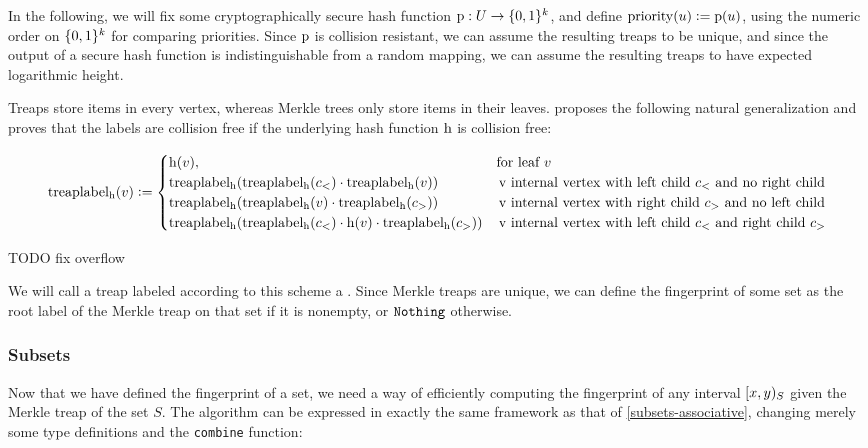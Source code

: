 In the following, we will fix some cryptographically secure hash function ${\operatorname{p}}: {U} \rightarrow {\{0, 1\}^k}$, and define $\operatorname{priority}(u) \vcentcolon= \operatorname{p}(u)$, using the numeric order on $\{0, 1\}^k$ for comparing priorities. Since $\operatorname{p}$ is collision resistant, we can assume the resulting treaps to be unique, and since the output of a secure hash function is indistinguishable from a random mapping, we can assume the resulting treaps to have expected logarithmic height.

Treaps store items in every vertex, whereas Merkle trees only store items in their leaves. \cite{buldas2002eliminating} proposes the following natural generalization and proves that the labels are collision free if the underlying hash function $\operatorname{h}$ is collision free:

  \[
   \operatorname{treaplabel_{\operatorname{h}}}(v) \vcentcolon= \begin{cases}
\operatorname{h}(v), &  \text{for leaf $v$} \\
\operatorname{treaplabel_{\operatorname{h}}}(\operatorname{treaplabel_{\operatorname{h}}}(c_{<}) \cdot \operatorname{treaplabel_{\operatorname{h}}}(v)) & \, \text{v internal vertex with left child $c_{<}$ and no right child}\\
\operatorname{treaplabel_{\operatorname{h}}}(\operatorname{treaplabel_{\operatorname{h}}}(v) \cdot \operatorname{treaplabel_{\operatorname{h}}}(c_{>})) & \, \text{v internal vertex with right child $c_{>}$ and no left child}\\
\operatorname{treaplabel_{\operatorname{h}}}(\operatorname{treaplabel_{\operatorname{h}}}(c_{<}) \cdot \operatorname{h}(v) \cdot \operatorname{treaplabel_{\operatorname{h}}}(c_{>})) & \, \text{v internal vertex with left child $c_{<}$ and right child $c_{>}$}
\end{cases}
  \]

TODO fix overflow

We will call a treap labeled according to this scheme a . Since Merkle treaps are unique, we can define the fingerprint of some set as the root label of the Merkle treap on that set if it is nonempty, or $\mathtt{Nothing}$ otherwise.

\subsubsection{Subsets}

Now that we have defined the fingerprint of a set, we need a way of efficiently computing the fingerprint of any interval $[{x},{y})_{S}$ given the Merkle treap of the set $S$. The algorithm can be expressed in exactly the same framework as that of \cref{subsets-associative}, changing merely some type definitions and the \texttt{combine} function:

